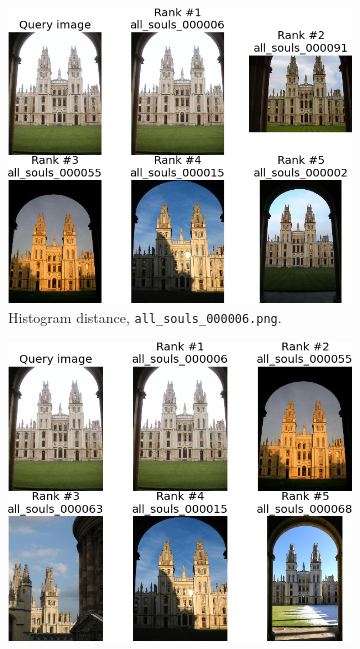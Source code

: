 \documentclass[a4paper,10pt,twoside]{article}
\begin{document}
\begin{figure}
  \begin{subfigure}{0.47\textwidth}
    \centering
    \includegraphics[width=\textwidth]{ranking_h_6}
    \caption{Histogram distance, \texttt{all\_souls\_000006.png}.}
  \end{subfigure}
  \hspace*{\fill}
  \begin{subfigure}{0.47\textwidth}
    \centering
    \includegraphics[width=\textwidth]{ranking_l_6}

\end{subfigure}
\end{figure}
\end{document}
